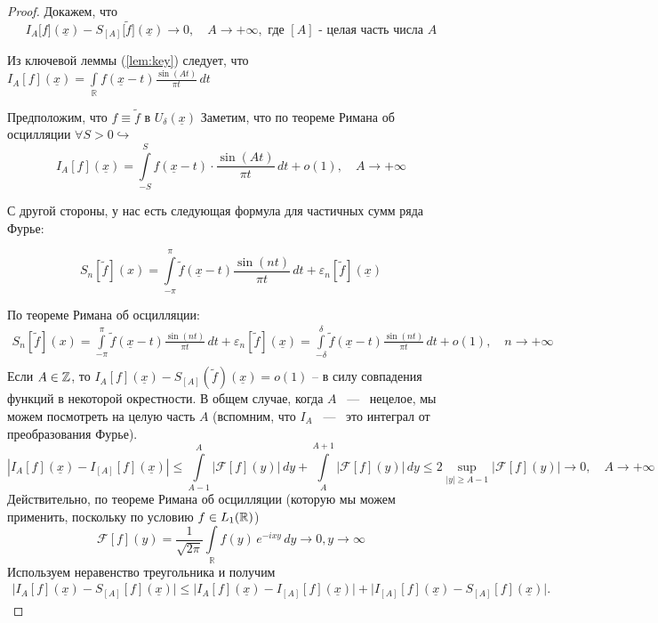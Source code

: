 \begin{proof}

Докажем, что 
\[
I_A \bigl[f\bigr](\underline{x}) - S_{[A]}\bigl[\widetilde{f}\bigr](\underline{x}) \longrightarrow 0, \quad A \to +\infty, \text{ где $[A]$ - целая часть числа $A$}
\]

Из ключевой леммы (\ref{lem:key}) следует, что $I_A[f](\underline{x}) = \int\limits_{\mathbb{R}} f(\underline{x} - t) \frac{\sin(At)}{\pi t} \, dt$

Предположим, что $f \equiv \widetilde{f}  
    \text{ в } U_\delta(\underline{x})$ 
Заметим, что по теореме Римана об осцилляции $\forall S > 0 \hookrightarrow$
\[
I_A \left[ f \right](\underline{x}) = \int\limits_{-S}^{S} f(\underline{x} - t) \cdot \frac{\sin(At)}{\pi t} \, dt + o(1), \quad A \to +\infty
\]

С другой стороны, у нас есть следующая формула для частичных сумм ряда Фурье:

\[
S_n \left[\widetilde{f}\right](x) = \int\limits_{-\pi}^{\pi} \widetilde{f}(\underline{x} - t) \frac{\sin(nt)}{\pi t} \, dt + \varepsilon_n \left[\widetilde{f}\right](\underline{x})
\]

По теореме Римана об осцилляции: %
\begin{gather*}
    S_n \left[\widetilde{f}\right](x) = \int\limits_{-\pi}^{\pi} \widetilde{f}(\underline{x} - t) \frac{\sin(nt)}{\pi t} \, dt + \varepsilon_n \left[\widetilde{f}\right](\underline{x}) = \int\limits_{-\delta}^{\delta} \widetilde{f}(\underline{x} - t) \frac{\sin(nt)}{\pi t} \, dt + o(1), \quad n \rightarrow +\infty\\
\end{gather*}
Если $A \in \mathbb{Z}$, то $I_A[f](\underline{x}) - S_{[A]}(\widetilde{f})(\underline{x}) = o(1)$ -- в силу совпадения функций в некоторой окрестности.
В общем случае, когда $A$ ~---~ нецелое, мы можем посмотреть на целую часть $A$
(вспомним, что $I_A$ ~---~ это интеграл от преобразования Фурье).
\[
\left| I_A \left[ f \right] (\underline{x}) - I_{[A]} \left[ f \right] (\underline{x}) \right| 
\leq 
\int\limits_{A-1}^{A} \left| \mathcal{F} [f](y) \right| \, dy + 
\int\limits_{A}^{A+1} \left| \mathcal{F} [f](y) \right| \, dy
\leq 2 \sup_{|y| \geq A-1} \left| \mathcal{F} [f](y) \right| \longrightarrow 0, \quad A \rightarrow +\infty
\]
Действительно, по теореме Римана об осцилляции (которую мы можем применить, поскольку по условию $f \in L_1(\mathbb{R})$)
\[
\mathcal{F} \left[ f \right](y)  = \frac{1}{\sqrt{2 \pi}} \int\limits_{\mathbb{R}} f(y) \, e^{-ixy} \, dy \longrightarrow 0, y \longrightarrow \infty
\]
Используем неравенство треугольника и получим
\[
\begin{aligned}
\bigl|I_{A}[f](\underline{x}) - S_{[A]}[f](\underline{x})\bigr|
 \leq
\bigl|I_{A}[f](\underline{x}) - I_{[A]}[f](\underline{x})\bigr| + \bigl|I_{[A]}[f](\underline{x}) - S_{[A]}[f](\underline{x})\bigr|.
\end{aligned}
\]


\end{proof}
